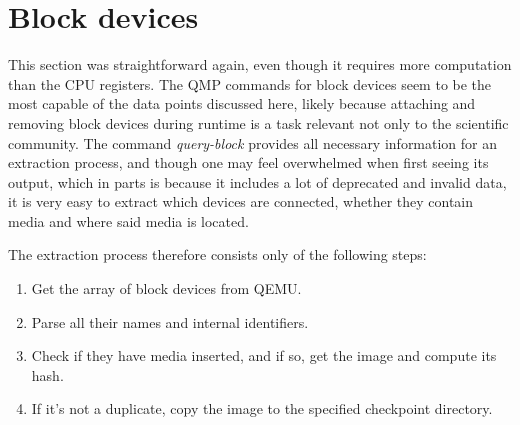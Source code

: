 \section{Block devices}
This section was straightforward again, even though it requires more computation than the CPU registers.
The QMP commands for block devices seem to be the most capable of the data points discussed here,
likely because attaching and removing block devices during runtime is a task relevant not only to the scientific community.
The command \emph{query-block} provides all necessary information for an extraction process,
and though one may feel overwhelmed when first seeing its output,
which in parts is because it includes a lot of deprecated and invalid data,
it is very easy to extract which devices are connected, whether they contain media and where said media is located.

The extraction process therefore consists only of the following steps:
\begin{enumerate}
    \item Get the array of block devices from QEMU.
    \item Parse all their names and internal identifiers.
    \item Check if they have media inserted, and if so, get the image and compute its hash.
    \item If it's not a duplicate, copy the image to the specified checkpoint directory.
\end{enumerate}

